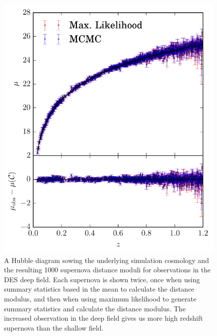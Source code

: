 \documentclass[a4paper,fleqn,usenatbib]{mnras}
\begin{document}
\begin{figure}
	\includegraphics[width=\columnwidth]{../output/obs_cosmology_deep.pdf}
	\caption{A Hubble diagram sowing the underlying simulation cosmology and the resulting 1000 supernova distance moduli for observations in the DES deep field. Each supernova is shown twice, once when using summary statistics based in the mean to calculate the distance modulus, and then when using maximum likelihood to generate summary statistics and calculate the distance modulus. The increased observation in the deep field gives us more high redshift supernova than the shallow field.}
	\label{fig:obs_cosmology_deep}
\end{figure}
\end{document}
